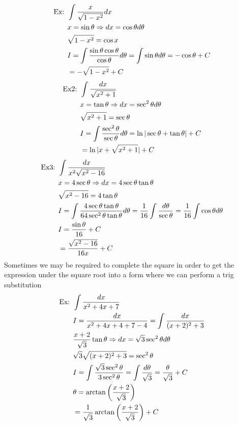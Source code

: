 \documentclass[11pt, fleqn]{article}
\begin{document}
\begin{align*}
    \text{Ex: }&\int \frac{x}{\sqrt{1-x^2}}dx\\
    &x=\sin \theta\Rightarrow dx=\cos\theta d\theta\\
    &\sqrt{1-x^2}=\cos x\\
    &I=\int\frac{\sin\theta\cos\theta}{\cos\theta}d\theta=\int\sin\theta d\theta=-\cos\theta+C\\
    &=-\sqrt{1-x^2}+C
\end{align*}
\begin{align*}
    \text{Ex2: }&\int\frac{dx}{\sqrt{x^2+1}}\\
    &x=\tan\theta\Rightarrow dx=\sec^2\theta d\theta\\
    &\sqrt{x^2+1}=\sec\theta\\
    &I=\int\frac{\sec^2\theta}{\sec\theta}d\theta=\ln|\sec\theta+\tan\theta|+C\\
    &=\ln|x+\sqrt{x^2+1}|+C
\end{align*}
\begin{align*}
    \text{Ex3: }&\int\frac{dx}{x^2\sqrt{x^2-16}}\\
    &x=4\sec\theta\Rightarrow dx=4\sec\theta\tan\theta\\
    &\sqrt{x^2-16}=4\tan\theta\\
    &I=\int\frac{4\sec\theta\tan\theta}{64\sec^2\theta\tan\theta}d\theta=\frac{1}{16}\int\frac{d\theta}{\sec\theta}=\frac{1}{16}\int\cos\theta d\theta\\
    &I=\frac{\sin\theta}{16}+C\\
    &=\frac{\sqrt{x^2-16}}{16x}+C
\end{align*}
Sometimes we may be required to complete the square in order to get the expression under the square root into a form where we can perform a trig substitution
\begin{align*}
    \text{Ex: }&\int\frac{dx}{x^2+4x+7}\\
    &I=\frac{dx}{x^2+4x+4+7-4}=\int\frac{dx}{(x+2)^2+3}\\
    &\frac{x+2}{\sqrt{3}}\tan\theta\Rightarrow dx=\sqrt{3}\sec^2\theta d\theta\\
    &\sqrt{3}\sqrt{(x+2)^2+3}=\sec^2\theta\\
    &I=\int\frac{\sqrt{3}\sec^2\theta}{3\sec^2\theta}=\int\frac{d\theta}{\sqrt{3}}=\frac{\theta}{\sqrt{3}}+C\\
    &\theta=\arctan\left( \frac{x+2}{\sqrt{3}} \right)\\
    &=\frac{1}{\sqrt{3}}\arctan\left( \frac{x+2}{\sqrt{3}} \right)+C
\end{align*}
\end{document}
